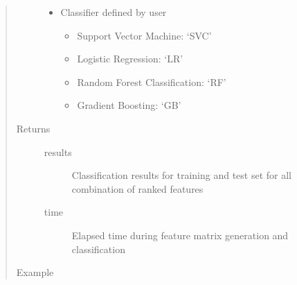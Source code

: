 \documentclass[letterpaper,10pt,english]{sphinxmanual}
\begin{document}
\begin{fulllineitems}
\begin{quote}
\begin{description}
\begin{itemize}
\item {} 
 \textendash{} 
Classifier defined by user
\begin{itemize}
\item {} 
Support Vector Machine: ‘SVC’

\item {} 
Logistic Regression: ‘LR’

\item {} 
Random Forest Classification: ‘RF’

\item {} 
Gradient Boosting: ‘GB’

\end{itemize}


\end{itemize}

\item[{Returns}] \leavevmode\begin{description}
\item[{results}] \leavevmode
Classification results for training and test set for all combination of ranked features

\item[{time}] \leavevmode
Elapsed time during feature matrix generation and classification

\end{description}

\item[{Example}] \leavevmode
\begin{sphinxVerbatim}[commandchars=\\\{\}]
   
  
  
  


\end{sphinxVerbatim}
\end{description}
\end{quote}
\end{fulllineitems}
\end{document}
